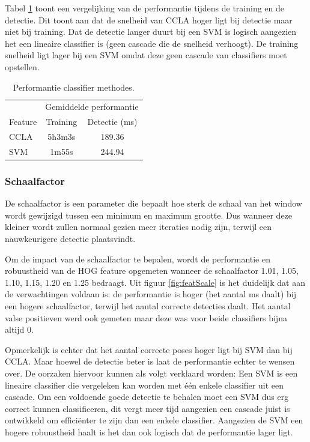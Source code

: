 Tabel \ref{tab:class_perf} toont een vergelijking van de performantie tijdens de training en de detectie. Dit toont aan dat de snelheid van CCLA hoger ligt bij detectie maar niet bij training. Dat de detectie langer duurt bij een SVM is logisch aangezien het een lineaire classifier is (geen cascade die de snelheid verhoogt). De training snelheid ligt lager bij een SVM omdat deze geen cascade van classifiers moet opstellen.

\begin{table}
  \centering
  \begin{tabular}{@{}lcc@{}} \toprule
    & \multicolumn{2}{c}{Gemiddelde performantie} \\ \cmidrule(r){2-3}
    Feature & Training & Detectie (ms)\\ \midrule
    CCLA & 5h3m3s & 189.36 \\
    SVM & 1m55s & 244.94 \\ \bottomrule
  \end{tabular}
  \caption{Performantie classifier methodes.}
  \label{tab:class_perf}
\end{table}

\subsubsection*{Schaalfactor}

De schaalfactor is een parameter die bepaalt hoe sterk de schaal van het window wordt gewijzigd tussen een minimum en maximum grootte. Dus wanneer deze kleiner wordt zullen normaal gezien meer iteraties nodig zijn, terwijl een nauwkeurigere detectie plaatsvindt.

Om de impact van de schaalfactor te bepalen, wordt de performantie en robuustheid van de HOG feature opgemeten wanneer de schaalfactor 1.01, 1.05, 1.10, 1.15, 1.20 en 1.25 bedraagt. Uit figuur \ref{fig:featScale} is het duidelijk dat aan de verwachtingen voldaan is: de performantie is hoger (het aantal ms daalt) bij een hogere schaalfactor, terwijl het aantal correcte detecties daalt. Het aantal valse positieven werd ook gemeten maar deze was voor beide classifiers bijna altijd 0.

Opmerkelijk is echter dat het aantal correcte poses hoger ligt bij SVM dan bij CCLA. Maar hoewel de detectie beter is laat de performantie echter te wensen over. De oorzaken hiervoor kunnen als volgt verklaard worden: Een SVM is een lineaire classifier die vergeleken kan worden met \'e\'en enkele classifier uit een cascade. Om een voldoende goede detectie te behalen moet een SVM dus erg correct kunnen classificeren, dit vergt meer tijd aangezien een cascade juist is ontwikkeld om effici\"enter te zijn dan een enkele classifier. Aangezien de SVM een hogere robuustheid haalt is het dan ook logisch dat de performantie lager ligt.


